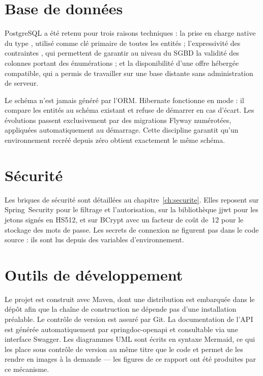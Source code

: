 \section{Base de données}

PostgreSQL a été retenu pour trois raisons techniques : la prise en charge native du type
, utilisé comme clé primaire de toutes les entités ; l'expressivité des
contraintes , qui permettent de garantir au niveau du SGBD la validité des
colonnes portant des énumérations ; et la disponibilité d'une offre hébergée compatible,
qui a permis de travailler sur une base distante sans administration de serveur.

Le schéma n'est jamais généré par l'ORM. Hibernate fonctionne en mode  :
il compare les entités au schéma existant et refuse de démarrer en cas d'écart. Les
évolutions passent exclusivement par des migrations Flyway numérotées, appliquées
automatiquement au démarrage. Cette discipline garantit qu'un environnement recréé depuis
zéro obtient exactement le même schéma.

\section{Sécurité}

Les briques de sécurité sont détaillées au chapitre~\ref{ch:securite}. Elles reposent sur
Spring~Security pour le filtrage et l'autorisation, sur la bibliothèque jjwt pour les
jetons signés en HS512, et sur BCrypt avec un facteur de coût de~12 pour le stockage des
mots de passe. Les secrets de connexion ne figurent pas dans le code source : ils sont lus
depuis des variables d'environnement.

\section{Outils de développement}

Le projet est construit avec Maven, dont une distribution est embarquée dans le dépôt afin
que la chaîne de construction ne dépende pas d'une installation préalable. Le contrôle de
version est assuré par Git. La documentation de l'API est générée automatiquement par
springdoc-openapi et consultable via une interface Swagger. Les diagrammes UML sont écrits
en syntaxe Mermaid, ce qui les place sous contrôle de version au même titre que le code et
permet de les rendre en images à la demande --- les figures de ce rapport ont été produites
par ce mécanisme.

